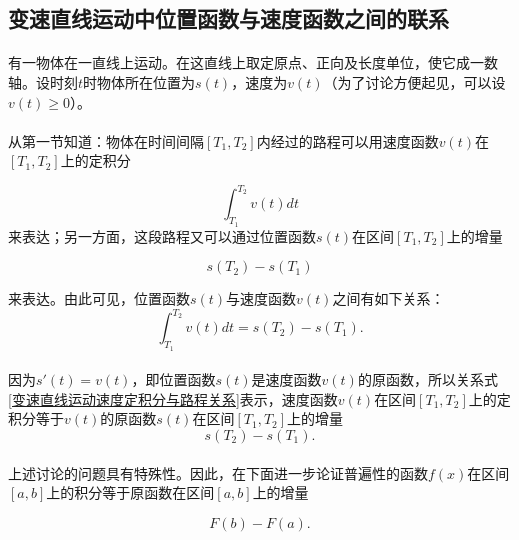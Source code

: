 \subsection{变速直线运动中位置函数与速度函数之间的联系}
\paragraph{}
有一物体在一直线上运动。在这直线上取定原点、正向及长度单位，使它成一数轴。设时刻$t$时物体所在位置为$s(t)$，速度为$v(t)$（为了讨论方便起见，可以设$v(t) \geq 0$）。

\paragraph{}
从第一节知道：物体在时间间隔$[T_1,T_2]$内经过的路程可以用速度函数$v(t)$在$[T_1,T_2]$上的定积分

\begin{equation*}
  \int_{T_1}^{T_2}v(t)dt
\end{equation*}
来表达；另一方面，这段路程又可以通过位置函数$s(t)$在区间$[T_1,T_2]$上的增量

\begin{equation*}
  s(T_2) - s(T_1)
\end{equation*}

来表达。由此可见，位置函数$s(t)$与速度函数$v(t)$之间有如下关系：
\begin{equation}
  \label{变速直线运动速度定积分与路程关系}
  \int_{T_1}^{T_2}v(t)dt = s(T_2) - s(T_1).
\end{equation}

\paragraph{}
因为$s'(t)=v(t)$，即位置函数$s(t)$是速度函数$v(t)$的原函数，所以关系式\eqref{变速直线运动速度定积分与路程关系}表示，速度函数$v(t)$在区间$[T_1,T_2]$上的定积分等于$v(t)$的原函数$s(t)$在区间$[T_1,T_2]$上的增量
\begin{equation*}
  s(T_2) - s(T_1).
\end{equation*}

\paragraph{}
上述讨论的问题具有特殊性。因此，在下面进一步论证普遍性的函数$f(x)$在区间$[a,b]$上的积分等于原函数在区间$[a,b]$上的增量

\begin{equation*}
  F(b) - F(a).
\end{equation*}

